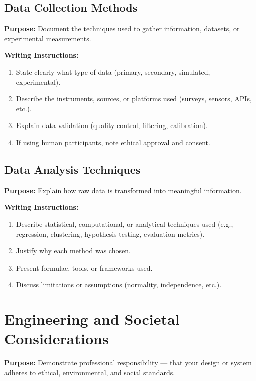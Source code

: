 \subsection{ Data Collection Methods}

{\color{blue}\textbf{Purpose:}
Document the techniques used to gather information, datasets, or experimental measurements.} \\

{\color{red}\textbf{Writing Instructions:}
\begin{enumerate}
    \item State clearly what type of data (primary, secondary, simulated, experimental).
    
    \item Describe the instruments, sources, or platforms used (surveys, sensors, APIs, etc.).
    
    \item Explain data validation (quality control, filtering, calibration).
    
    \item If using human participants, note ethical approval and consent.
\end{enumerate}}

\subsection{Data Analysis Techniques}

{\color{blue}\textbf{Purpose:}
Explain how raw data is transformed into meaningful information.}

{\color{red}\textbf{Writing Instructions:}
\begin{enumerate}
    \item Describe statistical, computational, or analytical techniques used (e.g., regression, clustering, hypothesis testing, evaluation metrics).
    
    \item Justify why each method was chosen.
    
    \item Present formulae, tools, or frameworks used.
    
    \item Discuss limitations or assumptions (normality, independence, etc.).
\end{enumerate}}

\section{Engineering and Societal Considerations}
{\color{blue}\textbf{Purpose:}
Demonstrate professional responsibility — that your design or system adheres to ethical, environmental, and social standards.} \\

